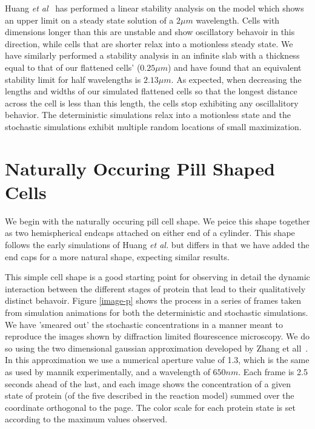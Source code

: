 \documentclass[letterpaper,twocolumn,amsmath,amssymb,pre]{revtex4-1}
\begin{document}
Huang \emph{et al}~\cite{huang2003dynamic} has performed a linear
stability analysis on the model which shows an upper limit on a steady
state solution of a $2\mu m$ wavelength.  Cells with dimensions longer
than this are unstable and show oscillatory behavoir in this
direction, while cells that are shorter relax into a motionless steady
state.  We have similarly performed a stability analysis in an
infinite slab with a thickness equal to that of our flattened cells'
($0.25\mu m$) and have found that an equivalent stability limit for
half wavelengths is $2.13\mu m$. As expected, when decreasing the
lengths and widths of our simulated flattened cells so that the
longest distance across the cell is less than this length, the cells
stop exhibiting any oscillalitory behavior.  The deterministic
simulations relax into a motionless state and the stochastic
simulations exhibit multiple random locations of small maximization.

\section{Naturally Occuring Pill Shaped Cells}

We begin with the naturally occuring pill cell shape.  We peice this
shape together as two hemispherical endcaps attached on either end of
a cylinder.  This shape follows the early simulations of Huang
\emph{et al.} but differs in that we have added the end caps for a
more natural shape, expecting similar results.

This simple cell shape is a good starting point for observing in
detail the dynamic interaction between the different stages of protein
that lead to their qualitatively distinct behavoir. Figure
\ref{image-p} shows the process in a series of frames taken from
simulation animations for both the deterministic and stochastic
simulations.  We have 'smeared out' the stochastic concentrations in a
manner meant to reproduce the images shown by diffraction limited
flourescence microscopy.  We do so using the two dimensional gaussian
approximation developed by Zhang et all~\cite{zhang2007gaussian}.  In
this approximation we use a numerical aperture value of 1.3, which is
the same as used by mannik experimentally, and a wavelength of
$650nm$.  Each frame is 2.5 seconds ahead of the last, and each image
shows the concentration of a given state of protein (of the five
described in the reaction model) summed over the coordinate orthogonal
to the page.  The color scale for each protein state is set according
to the maximum values observed.
\end{document}
